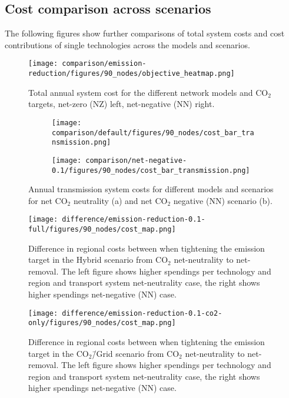 \documentclass[twocolumn]{article}
\newcommand{\carbon}{CO$_2$}
\newcommand{\carbonscenario}{CO$_2$\=/Grid scenario}
\newcommand{\hybridscenario}{Hybrid scenario}
\begin{document}
\clearpage
\subsection{Cost comparison across scenarios}
\label{sec:cost_comparison}

The following figures show further comparisons of total system costs and cost contributions of single technologies across the models and scenarios.

\begin{figure}[h!]
    \centering
    \texttt{[image: comparison/emission-reduction/figures/90\_nodes/objective\_heatmap.png]}
    \caption{Total annual system cost for the different network models and \carbon{} targets, net-zero (NZ) left, net-negative (NN) right.}
    \label{fig:objective_heatmap}
\end{figure}

\begin{figure}[h!]
    \centering
    \begin{subfigure}{.5\textwidth}
        \centering
        \texttt{[image: comparison/default/figures/90\_nodes/cost\_bar\_transmission.png]}
        \caption{}
        \label{fig:cost_bar_transmission}
    \end{subfigure}%
    \begin{subfigure}{.5\textwidth}
        \centering
        \texttt{[image: comparison/net-negative-0.1/figures/90\_nodes/cost\_bar\_transmission.png]}
        \caption{}
        \label{fig:cost_bar_transmission_nn}
    \end{subfigure}
    \caption{Annual transmission system costs for different models and scenarios for net \carbon{} neutrality (a) and net \carbon{} negative (NN) scenario (b).}
\end{figure}


\begin{figure}[ht!]
    \centering
    \texttt{[image: difference/emission-reduction-0.1-full/figures/90\_nodes/cost\_map.png]}
    \caption{Difference in regional costs between when tightening the emission target in the \hybridscenario{} from \carbon{} net-neutrality to net-removal. The left figure shows higher spendings per technology and region and transport system net-neutrality case, the right shows higher spendings net-negative (NN) case.}
    \label{fig:cost_map_difference_full_nn}
\end{figure}


\begin{figure}[ht!]
    \centering
    \texttt{[image: difference/emission-reduction-0.1-co2-only/figures/90\_nodes/cost\_map.png]}
    \caption{Difference in regional costs between when tightening the emission target in the \carbonscenario{} from \carbon{} net-neutrality to net-removal. The left figure shows higher spendings per technology and region and transport system net-neutrality case, the right shows higher spendings net-negative (NN) case.}
    \label{fig:cost_map_difference_co2_nn}
\end{figure}
\end{document}
